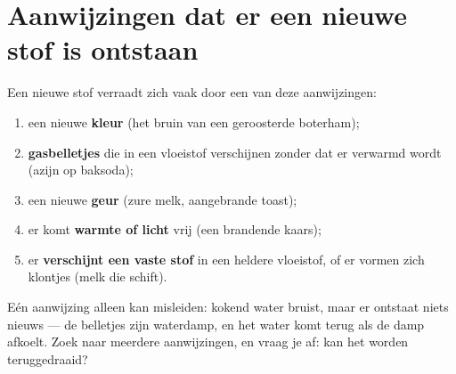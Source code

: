 \section{Aanwijzingen dat er een nieuwe stof is ontstaan}

\begin{method}\label{met:g5:irreversible-changes:clues}
Een nieuwe stof verraadt zich vaak door een van deze aanwijzingen:
\begin{enumerate}
  \item een nieuwe \textbf{kleur} (het bruin van een geroosterde
        boterham);
  \item \textbf{gasbelletjes} die in een vloeistof verschijnen zonder
        dat er verwarmd wordt (azijn op baksoda);
  \item een nieuwe \textbf{geur} (zure melk, aangebrande toast);
  \item er komt \textbf{warmte of licht} vrij (een brandende kaars);
  \item er \textbf{verschijnt een vaste stof} in een heldere vloeistof,
        of er vormen zich klontjes (melk die schift).
\end{enumerate}
Eén aanwijzing alleen kan misleiden: kokend water bruist, maar er
ontstaat niets nieuws --- de belletjes zijn waterdamp, en het water komt
terug als de damp afkoelt. Zoek naar meerdere aanwijzingen, en vraag je
af: kan het worden teruggedraaid?
\end{method}

